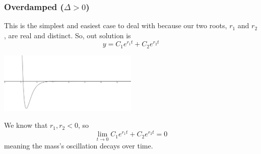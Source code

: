 \subsubsection{Overdamped ($\Delta > 0$)}
This is the simplest and easiest case to deal with because our two roots, $r_1$ and $r_2$, are real and distinct. So, out solution is
\begin{equation*}
	y = C_1e^{r_1 t} + C_2e^{r_2 t}
\end{equation*}
\begin{center}
	\includegraphics[width=0.5\textwidth]{./higherOrder/freeVibrs/overdamped.png}
\end{center}
We know that $r_1, r_2 < 0$, so
\begin{equation*}
	\lim\limits_{t \to 0}{C_1e^{r_1 t} + C_2e^{r_2 t}} = 0
\end{equation*}
meaning the mass's oscillation decays over time.